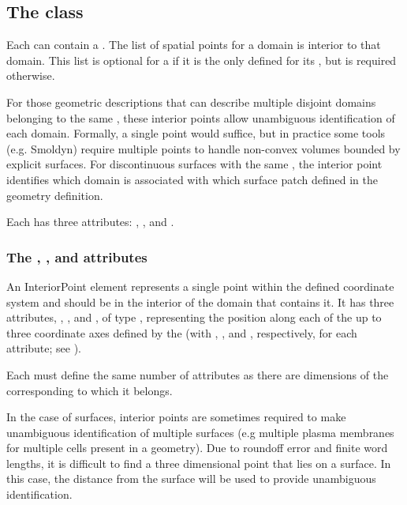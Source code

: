\subsection{The  class}
\label{interiorpoint-class}
Each \Domain can contain a \ListOfInteriorPoints. The list of spatial points for a domain is interior to that domain.  This list is optional for a \Domain if it is the only \Domain defined for its \DomainType, but is required otherwise.

For those geometric descriptions that can describe multiple disjoint domains belonging to the same , these interior points allow unambiguous identification of each domain.  Formally, a single point would suffice, but in practice some tools (e.g. Smoldyn) require multiple points to handle non-convex volumes bounded by explicit surfaces.  For discontinuous surfaces with the same , the interior point identifies which domain is associated with which surface patch defined in the geometry definition.

Each \InteriorPoint has three attributes: , , and . 

\subsubsection{The \fixttspace{}, , and  attributes}
An InteriorPoint element represents a single point within the defined coordinate system and should be in the interior of the domain that contains it. It has three attributes, , , and , of type , representing the position along each of the up to three coordinate axes defined by the \CoordinateComponents (with  , , and , respectively, for each  attribute; see ).

Each \InteriorPoint must define the same number of attributes as there are dimensions of the corresponding \Geometry to which it belongs.

In the case of surfaces, interior points are sometimes required to make unambiguous identification of multiple surfaces (e.g multiple plasma membranes for multiple cells present in a geometry).  Due to roundoff error and finite word lengths, it is difficult to find a three dimensional point that lies on a surface.  In this case, the distance from the surface will be used to provide unambiguous identification.


